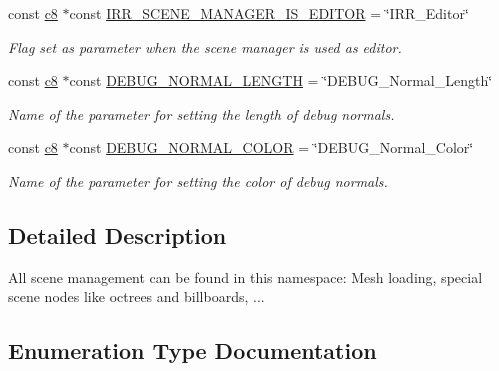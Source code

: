 \begin{DoxyCompactItemize}
const \hyperlink{namespaceirr_a9395eaea339bcb546b319e9c96bf7410}{c8} $\ast$const \hyperlink{namespaceirr_1_1scene_a8a06a6d3f0afc46bbf1bf2bc461b0973}{I\+R\+R\+\_\+\+S\+C\+E\+N\+E\+\_\+\+M\+A\+N\+A\+G\+E\+R\+\_\+\+I\+S\+\_\+\+E\+D\+I\+T\+OR} = \char`\"{}I\+R\+R\+\_\+\+Editor\char`\"{}
\begin{DoxyCompactList}\small\item\em Flag set as parameter when the scene manager is used as editor. \end{DoxyCompactList}\item 
const \hyperlink{namespaceirr_a9395eaea339bcb546b319e9c96bf7410}{c8} $\ast$const \hyperlink{namespaceirr_1_1scene_ab40d5d1c49b0ac71f026f360dcf70343}{D\+E\+B\+U\+G\+\_\+\+N\+O\+R\+M\+A\+L\+\_\+\+L\+E\+N\+G\+TH} = \char`\"{}D\+E\+B\+U\+G\+\_\+\+Normal\+\_\+\+Length\char`\"{}
\begin{DoxyCompactList}\small\item\em Name of the parameter for setting the length of debug normals. \end{DoxyCompactList}\item 
const \hyperlink{namespaceirr_a9395eaea339bcb546b319e9c96bf7410}{c8} $\ast$const \hyperlink{namespaceirr_1_1scene_a6e821825be0878c0f51491a664fa4bb9}{D\+E\+B\+U\+G\+\_\+\+N\+O\+R\+M\+A\+L\+\_\+\+C\+O\+L\+OR} = \char`\"{}D\+E\+B\+U\+G\+\_\+\+Normal\+\_\+\+Color\char`\"{}
\begin{DoxyCompactList}\small\item\em Name of the parameter for setting the color of debug normals. \end{DoxyCompactList}\end{DoxyCompactItemize}


\subsection{Detailed Description}
All scene management can be found in this namespace\+: Mesh loading, special scene nodes like octrees and billboards, ... 

\subsection{Enumeration Type Documentation}
\mbox{\label{namespaceirr_1_1scene_a2fc85a64604521ca063f1881b5dd1c61}} 
